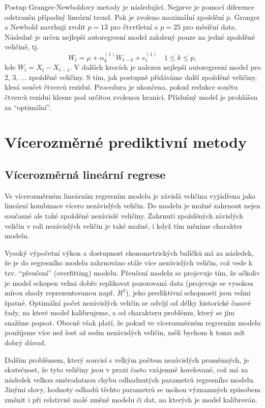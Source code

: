Postup Granger-Newboldovy metody je následující. Nejprve je pomocí diference odstraněn případný lineární trend. Pak je zvoleno maximální zpoždění $p$. Granger a Newbold navrhují zvolit $p = 13$ pro čtvrtletní a $p = 25$ pro měsíční data. Následně je určen nejlepší autoregresní model založený pouze na jedné zpožděné veličině, tj.
\begin{equation}
W_t = \mu + \alpha_k^{(1)} W_{t - k} + e_t^{(1)} \quad 1 \le k \le p,
\end{equation}
kde $W_t = X_t - X_{t - 1}$. V dalších krocích je nalezen nejlepší autoregresní model pro 2, 3, ... zpožděné veličiny. S tím, jak postupně přidáváme další zpožděné veličiny, klesá součet čtverců reziduí. Procedura je ukončena, pokud redukce součtu čtverců reziduí klesne pod určitou zvolenou hranici. Příslušný model je prohlášen za ``optimální''.

\section{Vícerozměrné prediktivní metody}

\subsection{Vícerozměrná lineární regrese}

Ve vícerozměrném lineárním regresním modelu je závislá veličina vyjádřena jako lineární kombinace vícero nezávislých veličin. Do modelu je možné zahrnout nejen současné ale také zpožděné nezávislé veličiny. Zahrnutí zpožděných závislých veličin v roli nezávislých veličin je také možné, i když tím měníme charakter modelu.

Vysoký výpočetní výkon a dostupnost ekonometrických balíčků má za následek, že je do regresního modelu zahrnováno stále více nezávislých veličin, což vede k tzv. ``přeučení'' (overfitting) modelu. Přeučení modelu se projevuje tím, že ačkoliv je model schopen velmi dobře replikovat pozorovaná data (projevuje se vysokou mírou shody reprezentovanou např. $R^2$), jeho prediktivní schopnosti jsou velmi špatné. Optimální počet nezávislých veličin se odvíjí od délky historické časové řady, na které model kalibrujeme, a od charakteru problému, který se jím snažíme popsat. Obecně však platí, že pokud ve vícerozměrném regresním modelu použijeme více než šest až sedm nezávislých veličin, měli bychom k tomu mít dobrý důvod.

Dalším problémem, který souvisí s velkým počtem nezávislých proměnných, je skutečnost, že tyto veličiny jsou v praxi často vzájemně korelované, což má za následek velkou směrodatnou chybu odhadnutých parametrů regresního modelu. Jinými slovy, hodnoty odhadů těchto parametrů se mohou významných způsobem změnit i při relativně malé změně modelu či dat, na kterých je model kalibrován.

